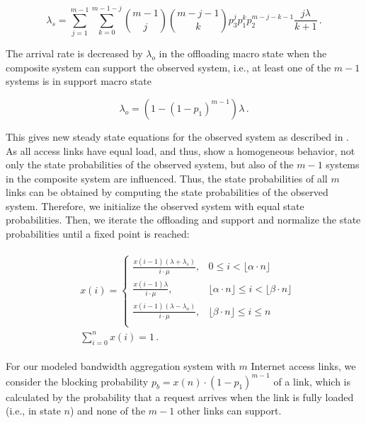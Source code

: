 \small
\begin{equation}
\lambda_{s} = \sum_{j=1}^{m-1}\sum_{k=0}^{m-1-j} \binom{m-1}{j}\binom{m-j-1}{k}p^j_3 p^k_1 p_2^{m-j-k-1}\frac{j\lambda}{k+1} \, .
\label{eq:lambda_s}
\end{equation}
\normalsize

The arrival rate is decreased by $\lambda_o$ in the offloading macro state when the composite system can support the observed system, i.e., at least one of the $m-1$ systems is in support macro state

\begin{equation}
\lambda_{o} = (1-(1-p_1)^{m-1})\lambda \, .
\end{equation}

This gives new steady state equations for the observed system as described in . As all access links have equal load, and thus, show a homogeneous behavior, not only the state probabilities of the observed system, but also of the $m-1$ systems in the composite system are influenced. Thus, the state probabilities of all $m$ links can be obtained by computing the state probabilities of the observed system. Therefore, we initialize the observed system with equal state probabilities. Then, we iterate the offloading and support and normalize the state probabilities  until a fixed point is reached:

\begin{align}
\begin{split}
&x(i)=
\begin{cases}
\frac{x(i-1)(\lambda+\lambda_s)}{i\cdot\mu}, &0\leq i < \lfloor\alpha\cdot n\rfloor \\
\frac{x(i-1)\lambda}{i\cdot\mu}, &\lfloor\alpha\cdot n\rfloor\leq i < \lfloor\beta\cdot n\rfloor \\
\frac{x(i-1)(\lambda-\lambda_o)}{i\cdot\mu}, &\lfloor\beta\cdot n\rfloor \leq i \leq n \\
\end{cases}\\
&\sum_{i=0}^n x(i) = 1 \, .
\end{split}
\label{eq:iteration}
\end{align}

For our modeled bandwidth aggregation system with $m$ Internet access links, we consider the blocking probability $p_{b} = x(n)\cdot (1-p_1)^{m-1}$ of a link, which is calculated by the probability that a request arrives when the link is fully loaded (i.e., in state $n$) and none of the $m-1$ other links can support.

